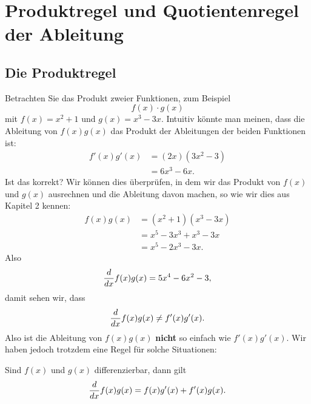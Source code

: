 \chapter{Produktregel und Quotientenregel der Ableitung}

\section{Die Produktregel}


Betrachten Sie das Produkt zweier Funktionen, zum Beispiel
\[
f(x)\cdot g(x)
\]
mit $f(x)=x^2+1$ und $g(x)=x^3-3x$. Intuitiv könnte man meinen, dass die Ableitung von $f(x)g(x)$ das Produkt der Ableitungen der beiden Funktionen ist:
\begin{align*}
f'(x)g'(x) &= (2x)(3x^2-3)\\
&= 6x^3-6x.
\end{align*}
Ist das korrekt? Wir können dies überprüfen, in dem wir das Produkt von $f(x)$
und $g(x)$ ausrechnen und die Ableitung davon machen, so wie wir dies aus Kapitel 2 kennen:
\begin{align*}
f(x)g(x) &= (x^2+1)(x^3-3x)\\
&=x^5-3x^3+x^3-3x\\
&=x^5-2x^3-3x.
\end{align*} 
Also
\[
\frac{d}{dx} f(x) g(x) = 5x^4-6x^2-3, 
\]
damit sehen wir, dass
\[
\frac{d}{dx} f(x) g(x) \ne  f'(x)g'(x).
\]
Also ist die Ableitung von $f(x)g(x)$ \textbf{nicht} so einfach wie
$f'(x)g'(x)$. Wir haben jedoch trotzdem eine Regel für solche Situationen:
\begin{mainTheorem}[Produktregel]\label{theorem:product-rule}
Sind $f(x)$ und $g(x)$ differenzierbar, dann gilt
\[
\frac{d}{dx} f(x)g(x) = f(x)g'(x)+f'(x)g(x).
\]
\end{mainTheorem}

